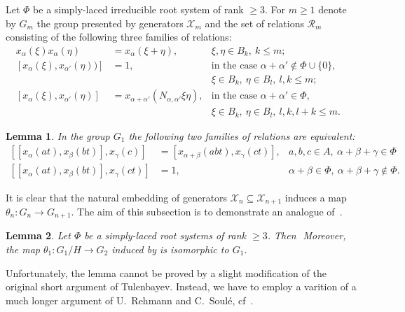 \documentclass[oneside, 10pt]{amsart}
\newcommand{\RR}[1]{\mathcal{R}_{#1}}
\numberwithin{equation}{section}
\newtheorem{lemma}{Lemma}
\numberwithin{lemma}{section}
\theoremstyle{definition}
\theoremstyle{remark}
\begin{document}
Let $\Phi$ be a simply-laced irreducible root system of rank $\geq 3$.
For $m\geq 1$ denote by $G_m$ the group presented by generators $\mathcal{X}_m$ and the set of relations $\RR{m}$ consisting of the following
 three families of relations:
\begin{align}
 \label{eq:am} \tag{$a_m$} x_\alpha(\xi) x_\alpha(\eta) & = x_\alpha(\xi+\eta),&  \xi,\eta\in B_k,\ k\leq m;&\\
 \label{eq:bm} \tag{$b_m$} [x_\alpha(\xi), x_{\alpha'}(\eta))] &  = 1, & \text{in the case $\alpha+\alpha'\not\in\Phi\cup\{0\}$,}\\
 \nonumber                                                     &       & \xi \in B_k,\ \eta \in B_l,\ l,k\leq m;\\
 \label{eq:cm} \tag{$c_m$} [x_\alpha(\xi), x_{\alpha'}(\eta)] & = x_{\alpha+\alpha'}(N_{\alpha,\alpha'}\xi\eta), & \text{in the case $\alpha+\alpha'\in \Phi$,}\\
 \nonumber                                                    &  & \xi \in B_k,\ \eta \in B_l,\ l, k, l+k \leq m.
 \end{align}

 \begin{lemma} In the group $G_1$ the following two families of relations are equivalent:
\begin{align} \nonumber \tag{$d_1$}
[[x_{\alpha}(a t), x_{\beta}(b t)],  x_{\gamma}(c)] & = [x_{\alpha + \beta}(a b t),  x_{\gamma}(c t)], & a,b,c \in A,\ \alpha + \beta + \gamma \in \Phi\\
\nonumber \tag{$e_1$}
[[x_{\alpha}(at), x_{\beta}(bt)], x_{\gamma}(ct) ]& = 1, & \alpha + \beta \in \Phi,\ \alpha+\beta+\gamma \not\in \Phi. \end{align}
 \end{lemma}

It is clear that the natural embedding of generators $\mathcal{X}_n \subseteq \mathcal{X}_{n+1}$ induces
 a map $\theta_n\colon G_n \to G_{n+1}$.
The aim of this subsection is to demonstrate an analogue of~\cite[Lemma~3.3]{Tu83}. 
\begin{lemma}\label{lem:tul3.3}
 Let $\Phi$ be a simply-laced root systems of rank $\geq 3$. 
 Then $ $
 Moreover, the map $\theta_1\colon G_1/H \to G_2$ induced by  is isomorphic to $G_1$.
\end{lemma}
Unfortunately, the lemma cannot be proved by a slight modification of the original short argument of Tulenbayev.
Instead, we have to employ a varition of a much longer argument of U.~Rehmann and C.~Soul{\'e}, cf~\cite{Re75,RS76}.
\end{document}
